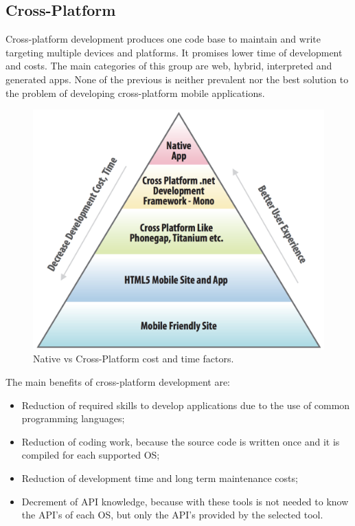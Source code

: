 \subsection{Cross-Platform}
Cross-platform development produces one code base to maintain and write targeting multiple devices and platforms. It promises lower time of development and costs. The main categories of this group are web, hybrid, interpreted and generated apps. None of the previous is neither prevalent nor the best solution to the problem of developing cross-platform mobile applications.
\begin{figure}[ht!]
	\centering
	\includegraphics[width=120mm]{figures/ch6/3.png}
	\caption{Native vs Cross-Platform cost and time factors.\cite{ref9}}
	\label{fig6.3}
\end{figure}  
The main benefits of cross-platform development are:
\begin{itemize}
	\item Reduction of required skills to develop applications due to the use of common programming languages;
	\item Reduction of coding work, because the source code is written once and it is compiled for each supported OS;
	\item Reduction of development time and long term maintenance costs;
	\item Decrement of API knowledge, because with these tools is not needed to know the API’s of each OS, but only the API’s provided by the selected tool.\cite{ref10}
\end{itemize}

